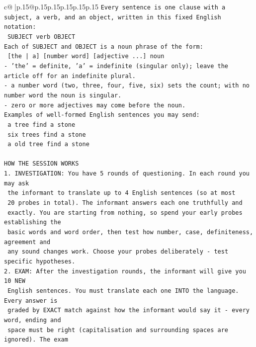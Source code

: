 \documentclass{article}
\begin{document}
{\begin{supertabular}{c@{$\;$}|p{.15\linewidth}@{}p{.15\linewidth}p{.15\linewidth}p{.15\linewidth}p{.15\linewidth}p{.15\linewidth}}
{{{\texttt{Every sentence is one clause with a subject, a verb, and an object, written in this fixed English notation:} \\
\texttt{    SUBJECT  verb  OBJECT} \\
\texttt{Each of SUBJECT and OBJECT is a noun phrase of the form:} \\
\texttt{    {[}the | a{]}  {[}number word{]}  {[}adjective ...{]}  noun} \\
\texttt{{-} 'the' = definite, 'a' = indefinite (singular only); leave the article off for an indefinite plural.} \\
\texttt{{-} a number word (two, three, four, five, six) sets the count; with no number word the noun is singular.} \\
\texttt{{-} zero or more adjectives may come before the noun.} \\
\texttt{Examples of well{-}formed English sentences you may send:} \\
\texttt{    a tree find a stone} \\
\texttt{    six trees find a stone} \\
\texttt{    a old tree find a stone} \\
\\ 
\texttt{HOW THE SESSION WORKS} \\
\texttt{1. INVESTIGATION: You have 5 rounds of questioning. In each round you may ask} \\
\texttt{   the informant to translate up to 4 English sentences (so at most} \\
\texttt{   20 probes in total). The informant answers each one truthfully and} \\
\texttt{   exactly. You are starting from nothing, so spend your early probes establishing the} \\
\texttt{   basic words and word order, then test how number, case, definiteness, agreement and} \\
\texttt{   any sound changes work. Choose your probes deliberately {-} test specific hypotheses.} \\
\texttt{2. EXAM: After the investigation rounds, the informant will give you 10 NEW} \\
\texttt{   English sentences. You must translate each one INTO the language. Every answer is} \\
\texttt{   graded by EXACT match against how the informant would say it {-} every word, ending and} \\
\texttt{   space must be right (capitalisation and surrounding spaces are ignored). The exam} \\
}}}
\end{supertabular}}
\end{document}
